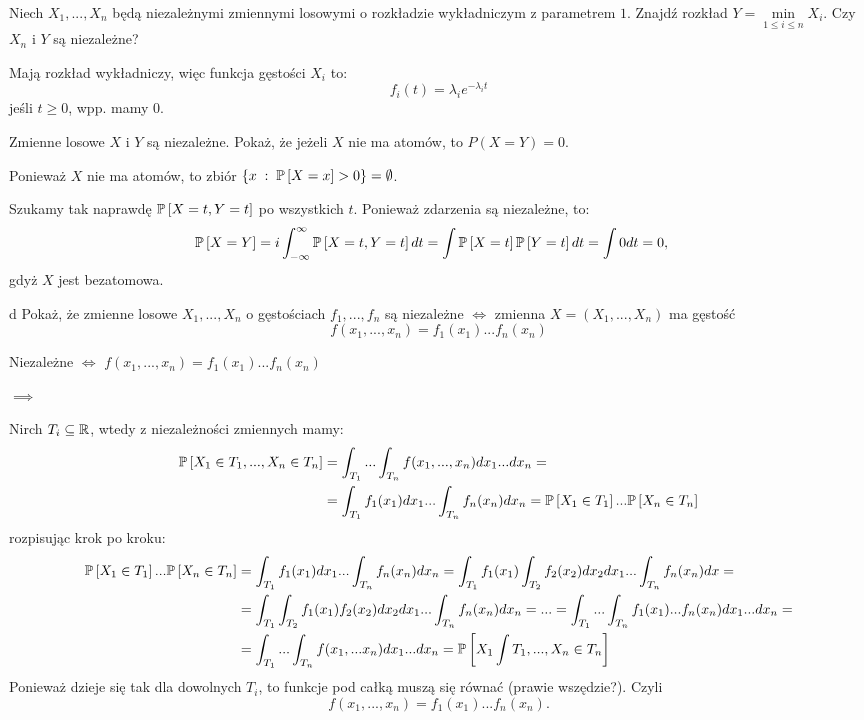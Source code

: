 \documentclass{article}
\begin{document}
\begin{problem}[4]{}
Niech $X_1,...,X_n$ będą niezależnymi zmiennymi losowymi o rozkładzie wykładniczym z parametrem $1$. Znajdź rozkład $Y=\min\limits_{1\leq i\leq n}X_i$. Czy $X_n$ i $Y$ są niezależne?
\end{problem}

Mają rozkład wykładniczy, więc funkcja gęstości $X_i$ to:
$$f_i(t)=\lambda_ie^{-\lambda_i t}$$
jeśli $t\geq 0$, wpp. mamy $0$.


\begin{problem}[5]{}
Zmienne losowe $X$ i $Y$ są niezależne. Pokaż, że jeżeli $X$ nie ma atomów, to $P(X=Y)=0$.
\end{problem}

Ponieważ $X$ nie ma atomów, to zbiór $\{x\;:\;\prob{X=x}>0\}=\emptyset$.

Szukamy tak naprawdę $\prob{X=t, Y=t}$ po wszystkich $t$. Ponieważ zdarzenia są niezależne, to:
\begin{align*}
    \prob{X=Y}&=i\int_{-\infty}^\infty\prob{X=t, Y=t}dt=\int\prob{X=t}\prob{Y=t}dt=\int0dt=0,
\end{align*}
gdyż $X$ jest bezatomowa.

\begin{problem}[7]{d}
Pokaż, że zmienne losowe $X_1,...,X_n$ o gęstościach $f_1,...,f_n$ są niezależne $\iff$ zmienna $X=(X_1,...,X_n)$ ma gęstość
$$f(x_1,...,x_n)=f_1(x_1)...f_n(x_n)$$
\end{problem}

\begin{center}
Niezależne $\iff$ $f(x_1,...,x_n)=f_1(x_1)...f_n(x_n)$
\end{center}

$\implies$

Nirch $T_i\subseteq\mathbb{R}$, wtedy z niezależności zmiennych mamy:
\begin{align*}
    \prob{X_1\in T_1,...,X_n\in T_n}&=\int_{T_1}...\int_{T_n}f(x_1,...,x_n)dx_1...dx_n=\\
    &=\int_{T_1}f_1(x_1)dx_1...\int_{T_n}f_n(x_n)dx_n=\prob{X_1\in T_1}...\prob{X_n\in T_n}
\end{align*}
rozpisując krok po kroku:
\begin{align*}
    \prob{X_1\in T_1}...\prob{X_n\in T_n}&=\int_{T_1}f_1(x_1)dx_1...\int_{T_n}f_n(x_n)dx_n=\int_{T_1}f_1(x_1)\int_{T_2}f_2(x_2)dx_2dx_1...\int_{T_n}f_n(x_n)dx=\\
    &=\int_{T_1}\int_{T_2}f_1(x_1)f_2(x_2)dx_2dx_1...\int_{T_n}f_n(x_n)dx_n=...=\int_{T_1}...\int_{T_n}f_1(x_1)...f_n(x_n)dx_1...dx_n=\\
    &=\int_{T_1}...\int_{T_n}f(x_1,...x_n)dx_1...dx_n=\prob{X_1\int T_1,...,X_n\in T_n}
\end{align*}
Ponieważ dzieje się tak dla dowolnych $T_i$, to funkcje pod całką muszą się równać (prawie wszędzie?). Czyli
$$f(x_1,...,x_n)=f_1(x_1)...f_n(x_n).$$
\end{document}
